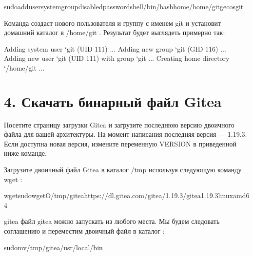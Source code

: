 \documentclass[letterpaper,10pt,russian]{sphinxmanual}
\begin{document}
\begin{sphinxVerbatim}[commandchars=\\\{\}]
\PYGZdl{}sudoadduser\PYGZhy{}\PYGZhy{}system\PYGZhy{}\PYGZhy{}group\PYGZhy{}\PYGZhy{}disabled\PYGZhy{}password\PYGZhy{}\PYGZhy{}shell/bin/bash\PYGZhy{}\PYGZhy{}home/home/git\PYGZhy{}\PYGZhy{}gecosgit
\end{sphinxVerbatim}

\sphinxAtStartPar
Команда создаст нового пользователя и группу с именем git и установит домашний каталог в /home/git . Результат будет выглядеть примерно так:

\begin{sphinxVerbatim}[commandchars=\\\{\}]
Adding system user `git\PYGZsq{} (UID 111) ...
Adding new group `git\PYGZsq{} (GID 116) ...
Adding new user `git\PYGZsq{} (UID 111) with group `git\PYGZsq{} ...
Creating home directory `/home/git\PYGZsq{} ...
\end{sphinxVerbatim}


\section{4. Скачать бинарный файл Gitea}
\label{\detokenize{git:id4}}
\sphinxAtStartPar
Посетите страницу загрузки Gitea и загрузите последнюю версию двоичного файла для вашей архитектуры.
На момент написания последняя версия — 1.19.3. Если доступна новая версия, измените переменную VERSION в приведенной ниже команде.

\sphinxAtStartPar
Загрузите двоичный файл Gitea в каталог /tmp используя следующую команду wget :

\begin{sphinxVerbatim}[commandchars=\\\{\}]
\PYGZdl{}wgetsudowget\PYGZhy{}O/tmp/giteahttps://dl.gitea.com/gitea/1.19.3/gitea\PYGZhy{}1.19.3\PYGZhy{}linux\PYGZhy{}amd64
\end{sphinxVerbatim}

\sphinxAtStartPar
gitea файл gitea можно запускать из любого места. Мы будем следовать соглашению и переместим двоичный файл в каталог  :

\begin{sphinxVerbatim}[commandchars=\\\{\}]
\PYGZdl{}sudomv/tmp/gitea/usr/local/bin
\end{sphinxVerbatim}
\end{document}

